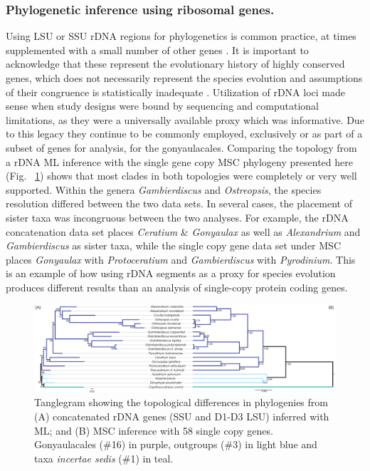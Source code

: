 \documentclass[12pt]{article}
\begin{document}
\subsubsection*{Phylogenetic inference using ribosomal genes.}
\FloatBarrier 
Using LSU or SSU rDNA regions for phylogenetics is common practice, at times supplemented with a small number of other genes \cite{shalchian2006combined,zhang2007three,saldarriaga2004molecular,murray2005improving,hoppenrath2010dinoflagellate}. 
It is important to acknowledge that these represent the evolutionary history of highly conserved genes, which does not necessarily represent the species evolution and assumptions of their congruence is statistically inadequate \cite{degnan2009gene}.
Utilization of rDNA loci made sense when study designs were bound by sequencing and computational limitations, as they were a universally available proxy which was informative. 
Due to this legacy they continue to be commonly employed, exclusively or as part of a subset of genes for analysis, for the gonyaulacales. 
Comparing the topology from a rDNA ML inference with the single gene copy MSC phylogeny presented here (Fig. ~\ref{fig:tanglerDNA}) shows that most clades in both topologies were completely or very well supported. 
Within the genera \emph{Gambierdiscus} and \emph{Ostreopsis}, the species resolution differed between the two data sets. 
In several cases, the placement of sister taxa was incongruous between the two analyses. 
For example, the rDNA concatenation data set places \emph{Ceratium} \& \emph{Gonyaulax} as well as \emph{Alexandrium} and \emph{Gambierdiscus} as sister taxa, while the single copy gene data set under MSC places \emph{Gonyaulax} with \emph{Protoceratium} and \emph{Gambierdiscus} with \emph{Pyrodinium}. 
This is an example of how using rDNA segments as a proxy for species evolution produces different results than an analysis of single-copy protein coding genes.

\begin{figure} 
\includegraphics[scale=.3]{figures/MSC-BI_vs_rDNA-ML.png} 
\caption{Tanglegram showing the topological differences in phylogenies from (A) concatenated rDNA genes (SSU and D1-D3 LSU) inferred with ML; and (B) MSC inference with 58 single copy genes. Gonyaulacales (\#16) in purple, outgroups (\#3) in light blue and taxa \textit{incertae sedis} (\#1) in teal.} 
\label{fig:tanglerDNA}
\end{figure} 
\FloatBarrier
\end{document}
